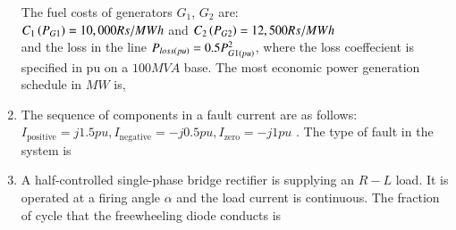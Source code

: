 \documentclass[journal]{IEEEtran}
\begin{document}
\begin{enumerate}
\begin{figure}[H]
			\label{stemplot}
		\end{figure}
	The fuel costs of generators $G_1$, $G_2$ are:\\
$C_1\left(P_{G1}\right)=10,000Rs/MWh$ and $C_2\left(P_{G2}\right)=12,500Rs/MWh$\\
and the loss in the line $P_{loss\left(pu\right)}=0.5P_{G1\left(pu\right)}^2$, where the loss coeffecient is specified in pu on a $100MVA$ base.  The most economic power generation schedule in $MW$ is,
	\begin{enumerate}
\end{enumerate}
\item The sequence of components in a fault current are as follows: $I_{\text{positive}}=j1.5pu,I_{\text{negative}}=-j0.5pu, I_{\text{zero}}=-j1pu$ . The type of fault in the system is
	\begin{enumerate}
\end{enumerate}
\item A half-controlled single-phase bridge rectifier is supplying an $R-L$ load. It is operated at a firing angle $\alpha$ and the load current is continuous. The fraction of cycle that the freewheeling diode conducts is
	\begin{enumerate}
\end{enumerate}


\end{enumerate}
\end{document}
